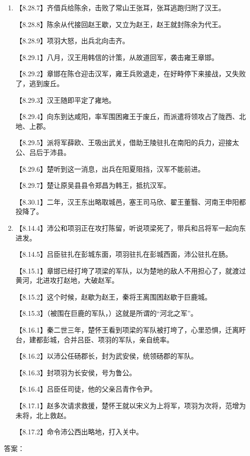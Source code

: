 \documentclass[fontset=none,11pt,a4paper]{ctexart}
\newcommand{\answerline}[1]{\underline{\hspace{#1}}}
\begin{document}
\begin{enumerate}[label=\Alph*.]
\noindent 【8.22.8】沛公派人与秦朝官吏巡行县城乡间，告谕百姓。\par
\noindent 【8.22.9】秦地的百姓大为高兴，争先恐后地拿出牛羊酒食款待士兵。\par
\noindent 【8.22.10】沛公又谦让不肯接受，说：“仓库的谷子很多，不缺乏，不愿破费百姓。”百姓更加高兴，唯恐沛公不做秦王。\par
  \item
\noindent 【8.28.7】齐借兵给陈余，击败了常山王张耳，张耳逃跑归附了汉王。\par
\noindent 【8.28.8】陈余从代接回赵王歇，又立为赵王，赵王就封陈余为代王。\par
\noindent 【8.28.9】项羽大怒，出兵北向击齐。\par
\noindent 【8.29.1】八月，汉王用韩信的计策，从故道回军，袭击雍王章邯。\par
\noindent 【8.29.2】章邯在陈仓迎击汉军，雍王兵败退走，在好畤停下来接战，又失败了，逃到废丘。\par
\noindent 【8.29.3】汉王随即平定了雍地。\par
\noindent 【8.29.4】向东到达咸阳，率军围困雍王于废丘，而派遣将领攻占了陇西、北地、上郡。\par
\noindent 【8.29.5】派将军薛欧、王吸出武关，借助王陵驻扎在南阳的兵力，迎接太公、吕后于沛县。\par
\noindent 【8.29.6】楚听到这一消息，出兵在阳夏阻挡，汉军不能前进。\par
\noindent 【8.29.7】楚让原吴县县令郑昌为韩王，抵抗汉军。\par
\noindent 【8.30.1】二年，汉王东出略取城邑，塞王司马欣、翟王董翳、河南王申阳都投降了。\par
  \item
\noindent 【8.14.4】沛公和项羽正在攻打陈留，听说项梁死了，带兵和吕将军一起向东进发。\par
\noindent 【8.14.5】吕臣驻扎在彭城东面，项羽驻扎在彭城西面，沛公驻扎在肠。\par
\noindent 【8.15.1】章邯已经打垮了项梁的军队，以为楚地的敌人不用担心了，就渡过黄河，北进攻打赵地，大破赵军。\par
\noindent 【8.15.2】这个时候，赵歇为赵王，秦将王离围困赵歇于巨鹿城。\par
\noindent 【8.15.3】（被围在巨鹿的军队，）这就是所谓的“河北之军”。\par
\noindent 【8.16.1】秦二世三年，楚怀王看到项梁的军队被打垮了，心里恐惧，迁离盱台，建都彭城，合并吕臣、项羽的军队，亲自统率。\par
\noindent 【8.16.2】以沛公任砀郡长，封为武安侯，统领砀郡的军队。\par
\noindent 【8.16.3】封项羽为长安侯，号为鲁公。\par
\noindent 【8.16.4】吕臣任司徒，他的父亲吕青作令尹。\par
\noindent 【8.17.1】赵多次请求救援，楚怀王就以宋义为上将军，项羽为次将，范增为未将，北上救赵。\par
\noindent 【8.17.2】命令沛公西出略地，打入关中。\par
\end{enumerate}
答案：\answerline{2.2cm}
\end{document}
